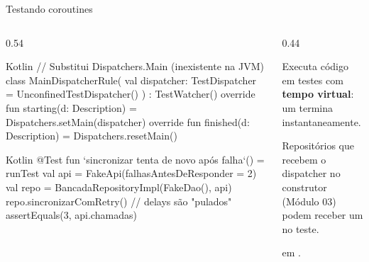 \documentclass[aspectratio=169,10pt]{beamer}
\begin{document}
\begin{frame}[fragile]{Testando coroutines}
  \begin{columns}[T]
    \begin{column}{0.54\textwidth}
\begin{codigo}[title=MainDispatcherRule.kt]{Kotlin}
// Substitui Dispatchers.Main (inexistente na JVM)
class MainDispatcherRule(
  val dispatcher: TestDispatcher =
    UnconfinedTestDispatcher()
) : TestWatcher() {
  override fun starting(d: Description) =
    Dispatchers.setMain(dispatcher)
  override fun finished(d: Description) =
    Dispatchers.resetMain()
}
\end{codigo}
\begin{codigo}[title=Teste com runTest]{Kotlin}
@Test
fun `sincronizar tenta de novo após falha`() = runTest {
  val api = FakeApi(falhasAntesDeResponder = 2)
  val repo = BancadaRepositoryImpl(FakeDao(), api)
  repo.sincronizarComRetry()   // delays são "pulados"
  assertEquals(3, api.chamadas)
}
\end{codigo}
    \end{column}
    \begin{column}{0.44\textwidth}
      \begin{conceito}
        Executa código  em testes com \textbf{tempo virtual}: um  termina instantaneamente.
      \end{conceito}
      \begin{dica}
        Repositórios que recebem o dispatcher no construtor (Módulo 03) podem receber um  no teste.
      \end{dica}
      \begin{dica}[Dependência]
         em .
      \end{dica}
    \end{column}
  \end{columns}
\end{frame}
\end{document}
